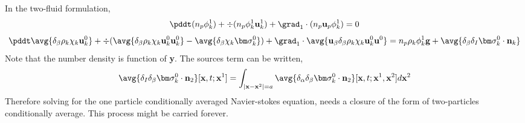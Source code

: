 In the two-fluid formulation, 
\begin{equation}
    \pddt (n_p \phi_k^1)
    +  \div (n_p\phi_k^1\textbf{u}_k^1)
    +  \grad_1 \cdot
    (n_p \textbf{u}_p\phi_k^1)
    = 0
\end{equation}
\begin{equation}
    \pddt \avg{\delta_\beta \rho_k \chi_k \textbf{u}_k^0 }
    + \div(
        \avg{\delta_\beta \rho_k \chi_k \textbf{u}_k^0 \textbf{u}^0_k  }
    - \avg{\delta_\beta\chi_k\bm\sigma^0_k})
    + \grad_1 \cdot
        \avg{\textbf{u}_\beta\delta_\beta \rho_k \chi_k \textbf{u}_k^0 \textbf{u}^0}
    = n_p  \rho_k \phi_k^1 \textbf{g} 
    + \avg{\delta_\beta\delta_I \bm\sigma_k^0 \cdot \textbf{n}_k}
\end{equation}
Note that the number density is function of \textbf{y}. 
The sources term can be written, 
\begin{equation*}
    \avg{\delta_I\delta_\beta \bm\sigma_k^0 \cdot \textbf{n}_2}[\textbf{x},t;\textbf{x}^1]
    = \int_{|\textbf{x}-\textbf{x}^2| = a}
    \avg{\delta_\alpha\delta_\beta \bm\sigma_k^0 \cdot \textbf{n}_2}[\textbf{x},t;\textbf{x}^1,\textbf{x}^2] d\textbf{x}^2
\end{equation*}
Therefore solving for the one particle conditionally averaged Navier-stokes equation, needs a closure of the form of two-particles conditionally average. 
This process might be carried forever. 
